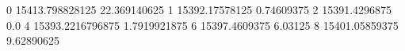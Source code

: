 0 15413.798828125 22.369140625
1 15392.17578125 0.74609375
2 15391.4296875 0.0
4 15393.2216796875 1.7919921875
6 15397.4609375 6.03125
8 15401.05859375 9.62890625
